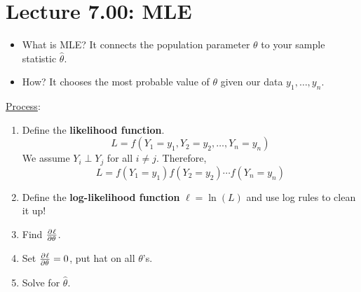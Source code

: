 \section{Lecture 7.00: MLE}
\begin{itemize}
    \item What is MLE\@? It connects the population parameter $ \theta $
          to your sample statistic $ \hat{\theta} $.
    \item How? It chooses the most probable value of $ \theta $
          given our data $ y_1,\ldots,y_n $.
\end{itemize}
\underline{Process}:
\begin{enumerate}[(1)]
    \item Define the \textbf{likelihood function}.
          \[ L=f(Y_1=y_1,Y_2=y_2,\ldots,Y_n=y_n) \]
          We assume $ Y_i\perp Y_j $ for all $ i\ne j $. Therefore,
          \[ L=f(Y_1=y_1)f(Y_2=y_2)\cdots f(Y_n=y_n) \]
    \item Define the \textbf{log-likelihood function} $ \ell=\ln(L) $ and use log rules to
          clean it up!
    \item Find $ \pd{\ell}{\theta} $.
    \item Set $ \pd{\ell}{\theta}=0 $, put hat on all $ \theta $'s.
    \item Solve for $ \hat{\theta} $.
\end{enumerate}
